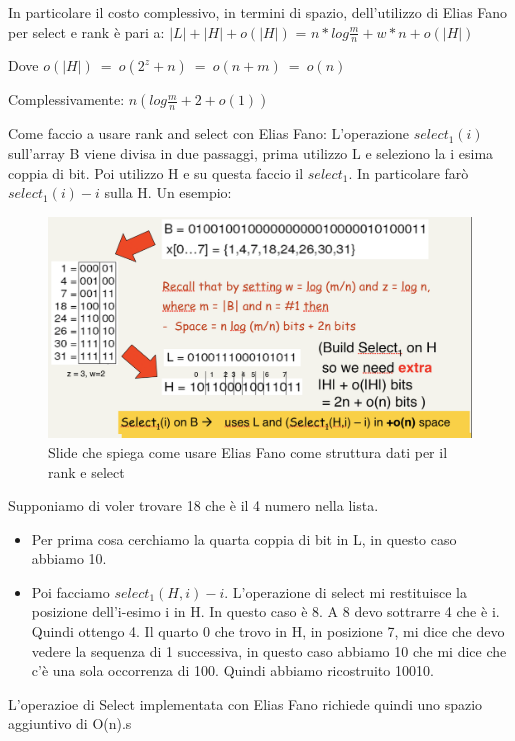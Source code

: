 \documentclass[14pt]{extreport}
\begin{document}
In particolare il costo complessivo, in termini di spazio, dell'utilizzo di Elias Fano per select e rank è pari a:
\newline
$|L|+|H|+o(|H|)$ = $n*log\frac{m}{n} + w*n + o(|H|)$

Dove $o(|H|)\ =\ o(2^z+n)\ =\ o(n+m)\ =\ o(n)$

Complessivamente: $n(log\frac{m}{n} + 2 + o(1))$

Come faccio a usare rank and select con Elias Fano:
L'operazione $select_1(i)$ sull'array B viene divisa in due passaggi, prima utilizzo L e seleziono la i esima coppia di bit. Poi utilizzo H e su questa faccio il $select_1$. In particolare farò $select_1(i)-i$ sulla H.
Un esempio: 

\begin{figure}[h!]
  \includegraphics[width=\linewidth]{EliasFanoRankeSelect.png}
  \caption{Slide che spiega come usare Elias Fano come struttura dati per il rank e select}
\end{figure}

Supponiamo di voler trovare 18 che è il 4 numero nella lista. \begin{itemize}
    \item Per prima cosa cerchiamo la quarta coppia di bit in L, in questo caso abbiamo 10.
    \item Poi facciamo $select_1(H,i) - i$. L'operazione di select mi restituisce la posizione dell'i-esimo i in H. In questo caso è 8. A 8 devo sottrarre 4 che è i. Quindi ottengo 4.
    Il quarto 0 che trovo in H, in posizione 7, mi dice che devo vedere la sequenza di 1 successiva, in questo caso abbiamo 10 che mi dice che c'è una sola occorrenza di 100. Quindi abbiamo ricostruito 10010.
\end{itemize}

L'operazioe di Select implementata con Elias Fano richiede quindi uno spazio aggiuntivo di O(n).s
\end{document}
